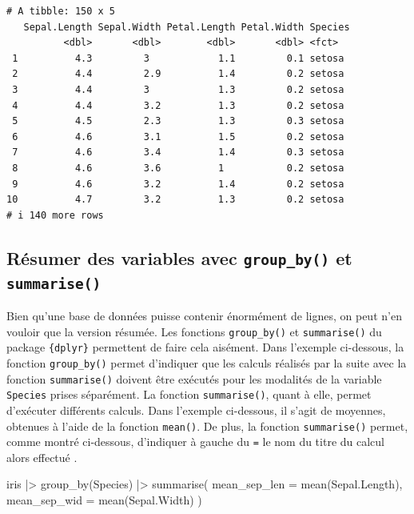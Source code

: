 \documentclass[
  letterpaper,
]{book}
\newenvironment{Shaded}{\begin{snugshade}}{\end{snugshade}}
\newcommand{\AttributeTok}[1]{\textcolor[rgb]{0.40,0.45,0.13}{#1}}
\newcommand{\FunctionTok}[1]{\textcolor[rgb]{0.28,0.35,0.67}{#1}}
\newcommand{\NormalTok}[1]{\textcolor[rgb]{0.00,0.23,0.31}{#1}}
\newcommand{\SpecialCharTok}[1]{\textcolor[rgb]{0.37,0.37,0.37}{#1}}
\begin{document}
\begin{verbatim}
# A tibble: 150 x 5
   Sepal.Length Sepal.Width Petal.Length Petal.Width Species
          <dbl>       <dbl>        <dbl>       <dbl> <fct>  
 1          4.3         3            1.1         0.1 setosa 
 2          4.4         2.9          1.4         0.2 setosa 
 3          4.4         3            1.3         0.2 setosa 
 4          4.4         3.2          1.3         0.2 setosa 
 5          4.5         2.3          1.3         0.3 setosa 
 6          4.6         3.1          1.5         0.2 setosa 
 7          4.6         3.4          1.4         0.3 setosa 
 8          4.6         3.6          1           0.2 setosa 
 9          4.6         3.2          1.4         0.2 setosa 
10          4.7         3.2          1.3         0.2 setosa 
# i 140 more rows
\end{verbatim}

\subsection{\texorpdfstring{Résumer des variables avec
\texttt{group\_by()} et
\texttt{summarise()}}{Résumer des variables avec group\_by() et summarise()}}\label{ruxe9sumer-des-variables-avec-group_by-et-summarise}

Bien qu'une base de données puisse contenir énormément de lignes, on
peut n'en vouloir que la version résumée. Les fonctions
\texttt{group\_by()} et \texttt{summarise()} du package
\texttt{\{dplyr\}} permettent de faire cela aisément. Dans l'exemple
ci-dessous, la fonction \texttt{group\_by()} permet d'indiquer que les
calculs réalisés par la suite avec la fonction \texttt{summarise()}
doivent être exécutés pour les modalités de la variable \texttt{Species}
prises séparément. La fonction \texttt{summarise()}, quant à elle,
permet d'exécuter différents calculs. Dans l'exemple ci-dessous, il
s'agit de moyennes, obtenues à l'aide de la fonction \texttt{mean()}. De
plus, la fonction \texttt{summarise()} permet, comme montré ci-dessous,
d'indiquer à gauche du \texttt{=} le nom du titre du calcul alors
effectué .

\begin{Shaded}
\begin{Highlighting}[]
\NormalTok{iris }\SpecialCharTok{|\textgreater{}}
  \FunctionTok{group\_by}\NormalTok{(Species) }\SpecialCharTok{|\textgreater{}}
  \FunctionTok{summarise}\NormalTok{(}
    \AttributeTok{mean\_sep\_len =} \FunctionTok{mean}\NormalTok{(Sepal.Length),}
    \AttributeTok{mean\_sep\_wid =} \FunctionTok{mean}\NormalTok{(Sepal.Width)}
\NormalTok{    )}
\end{Highlighting}
\end{Shaded}
\end{document}
